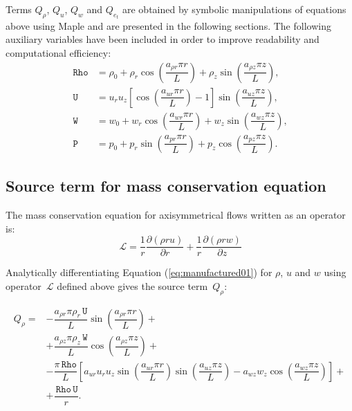 \documentclass[10pt]{article}
\newcommand{\Diff}[2] {\dfrac{\partial( #1)}{\partial #2}}
\newcommand{\Lo}{\,\mathcal{L}}
\newcommand{\Rho}{\,\mathtt{Rho}}
\newcommand{\PP}{\,\mathtt{P}}
\newcommand{\U}{\,\mathtt{U}}
\newcommand{\W}{\,\mathtt{W}}
\begin{document}
Terms $Q_\rho$, $Q_u$,  $Q_w$ and $Q_{e_t}$ are obtained by symbolic manipulations of equations above using Maple and are presented in the following sections. The following auxiliary variables have been included in order to improve readability and computational efficiency:
\begin{equation*}
 \begin{split}
\label{eq:aux_}
\Rho &= \rho_0+\rho_r \cos\left(\dfrac{a_{\rho r} \pi r}{L}\right)+\rho_z \sin\left(\dfrac{a_{\rho z} \pi z}{L}\right),\\
\U &= u_r u_z \left[\cos\left(\dfrac{a_{ur} \pi r}{L}\right)-1\right]\sin\left(\dfrac{a_{uz} \pi z}{L}\right),\\
\W &=w_0+w_r \cos\left(\dfrac{a_{w r} \pi r}{L}\right)+w_z \sin\left(\dfrac{a_{w z} \pi z}{L}\right),\\
\PP &=p_0+p_r \sin\left(\dfrac{a_{p r} \pi r}{L}\right)+p_z \cos\left(\dfrac{a_{p z} \pi z}{L}\right).
\end{split}
\end{equation*}

\subsection{Source term for mass conservation equation}

The mass conservation equation for axisymmetrical flows written as an operator is:
\begin{equation*}
 \Lo=  \dfrac{1}{r} \Diff{\rho r u}{r}+ \dfrac{1}{r}\Diff{\rho r w}{z}
\end{equation*}

Analytically differentiating Equation (\ref{eq:manufactured01}) for $\rho$, $u$ and $w$ using operator $\Lo$ defined above gives  the source term~$Q_{\rho}$:

\begin{equation}
 \begin{split}
Q_\rho  = &- \dfrac{a_{\rho r} \pi \rho_r \U}{L}\sin\left(\dfrac{a_{\rho r} \pi r}{L}\right)+ \\
&+\dfrac{a_{\rho z} \pi \rho_z \W }{L}\cos\left(\dfrac{a_{\rho z} \pi z}{L}\right)+ \\
&-\dfrac{ \pi \Rho}{L}\left[a_{ur} u_r u_z \sin\left(\dfrac{a_{ur} \pi r}{L}\right) \sin\left(\dfrac{a_{uz} \pi z}{L}\right)-a_{wz} w_z \cos\left(\dfrac{a_{wz} \pi z}{L}\right)\right]+ \\
&+\dfrac{\Rho \U}{r}.
\end{split}
\end{equation}
%
\end{document}
